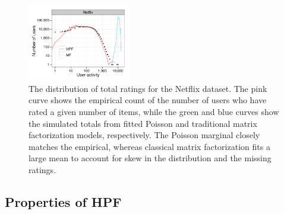 \begin{figure}[t!]
  \centering
  \includegraphics[width=0.4\textwidth]{figures/user_activity_sim_netflix.pdf}
  \caption{The distribution of total ratings for the Netflix dataset.
    The pink curve shows the empirical count of the number of users
    who have rated a given number of items, while the green and blue
    curves show the simulated totals from fitted Poisson and
    traditional matrix factorization models, respectively. The Poisson
    marginal closely matches the empirical, whereas classical matrix
    factorization fits a large mean to account for skew in the
    distribution and the missing ratings.}
\label{fig:marginals}
\end{figure}






\subsection{Properties of HPF}


